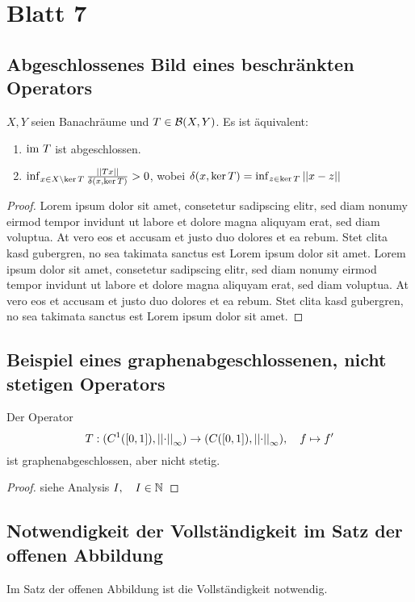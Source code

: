 \documentclass[FunkAnaskriptSS2017.tex]{subfiles}
\begin{document}
\newpage
\section{ Blatt 7}

\subsection{ Abgeschlossenes Bild eines beschränkten Operators}
\label{B7.1}
	$X,Y$ seien Banachräume und $T\in \mathcal{B}(X,Y)$. Es ist äquivalent:
	\begin{enumerate}
		\item $\textnormal{im } T$ ist abgeschlossen.
		\item $\inf_{x\in X\setminus \ker T} \frac{\left\lvert \left\lvert Tx \right\rvert \right\rvert}{\delta(x, \ker T )} > 0$, wobei $\delta(x, \ker T) = \inf_{z\in \ker T} \left\lvert \left\lvert x-z \right\rvert \right\rvert$
	\end{enumerate}
	
	\begin{proof}
	Lorem ipsum dolor sit amet, consetetur sadipscing elitr, sed diam nonumy eirmod tempor invidunt ut labore et dolore magna aliquyam erat, sed diam voluptua. At vero eos et accusam et justo duo dolores et ea rebum. Stet clita kasd gubergren, no sea takimata sanctus est Lorem ipsum dolor sit amet. Lorem ipsum dolor sit amet, consetetur sadipscing elitr, sed diam nonumy eirmod tempor invidunt ut labore et dolore magna aliquyam erat, sed diam voluptua. At vero eos et accusam et justo duo dolores et ea rebum. Stet clita kasd gubergren, no sea takimata sanctus est Lorem ipsum dolor sit amet.
	\end{proof}
	
	
\subsection{ Beispiel eines graphenabgeschlossenen, nicht stetigen Operators}
\label{B7.2}
	Der Operator 
	$$T: (C^1([0,1]),\left\lvert \left\lvert \cdot \right\rvert \right\rvert_\infty ) \to (C([0,1]),\left\lvert \left\lvert \cdot \right\rvert \right\rvert_\infty ),\quad f \mapsto f'  $$
	ist graphenabgeschlossen, aber nicht stetig.
	
	\begin{proof}
	siehe Analysis $I, \quad I \in \mathbb{N}$
	\end{proof}


\subsection{ Notwendigkeit der Vollständigkeit im Satz der offenen Abbildung}
\label{B7.3}
	Im Satz der offenen Abbildung ist die Vollständigkeit notwendig.
	
\end{document}
